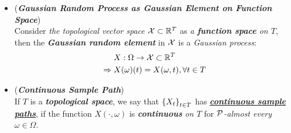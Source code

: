 \documentclass[11pt]{article}
\begin{document}
\begin{itemize}
\item \begin{remark} (\emph{\textbf{Gaussian Random Process as Gaussian Element on Function Space}}) \\
Consider \emph{the topological vector space} ${\mathcal X} \subset {\mathbb R}^{T}$ as \emph{a \textbf{function space} on $T$}, then the \emph{\textbf{Gaussian random element}} in ${\mathcal X}$ is a \emph{Gaussian process}:
\begin{align*}
&X: \Omega \to {\mathcal X} \subset {\mathbb R}^{T} \\
\Rightarrow \;&X(\omega)(t) = X(\omega, t), \forall t\in T
\end{align*}
\end{remark}

\item \begin{definition} (\emph{\textbf{Continuous Sample Path}})\\
If $T$ is a \emph{\textbf{topological space}}, we say that $\left\{X_t\right\}_{t\in T}$ has  \underline{\emph{\textbf{continuous sample paths}}}, if the
function $X(\cdot, \omega)$ is \emph{\textbf{continuous}} \emph{on $T$} for \emph{${\mathcal P}$-almost every $\omega \in \Omega$}.
\end{definition}
\end{itemize}
\end{document}
